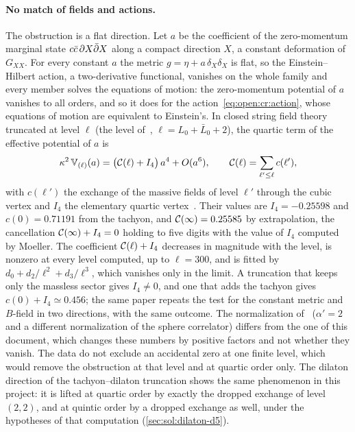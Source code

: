 \paragraph{No match of fields and actions.}
The obstruction is a flat direction.
Let $a$ be the coefficient of the zero-momentum marginal state $c \bar c \, \partial X \bar {\partial} X$ along a compact direction $X$, a constant deformation of $G_{XX}$.
For every constant $a$ the metric $g = \eta + a \, \delta_X \delta_X$ is flat, so the Einstein--Hilbert action, a two-derivative functional, vanishes on the whole family and every member solves the equations of motion: the zero-momentum potential of $a$ vanishes to all orders, and so it does for the action~\eqref{eq:open:cr:action}, whose equations of motion are equivalent to Einstein's.
In closed string field theory truncated at level $\ell$ (the level of~\cite{Yang:2005:TestingClosedString}, $\ell = L_0 + \bar L_0 + 2$), the quartic term of the effective potential of $a$ is
\begin{equation}
  \label{eq:open:cr:potential}
  \kappa^2 \, \mathbb V_{(\ell)}(a)
    = \bigl( {\mathcal{C}}(\ell) + I_4 \bigr) \, a^4
    + O(a^6),
  \qquad
  {\mathcal{C}}(\ell)
    = \sum_{\ell' \le \ell} c(\ell'),
\end{equation}
with $c(\ell')$ the exchange of the massive fields of level $\ell'$ through the cubic vertex and $I_4$ the elementary quartic vertex~\cite{Yang:2005:TestingClosedString}.
Their values are $I_4 = - 0.25598$ and $c(0) = 0.71191$ from the tachyon, and ${\mathcal{C}}(\infty) = 0.25585$ by extrapolation, the cancellation ${\mathcal{C}}(\infty) + I_4 = 0$ holding to five digits with the value of $I_4$ computed by Moeller.
The coefficient ${\mathcal{C}}(\ell) + I_4$ decreases in magnitude with the level, is nonzero at every level computed, up to $\ell = 300$, and is fitted by $d_0 + d_2 / \ell^2 + d_3 / \ell^3$, which vanishes only in the limit.
A truncation that keeps only the massless sector gives $I_4 \neq 0$, and one that adds the tachyon gives $c(0) + I_4 \simeq 0.456$; the same paper repeats the test for the constant metric and $B$-field in two directions, with the same outcome.
The normalization of~\cite{Yang:2005:TestingClosedString} ($\alpha' = 2$ and a different normalization of the sphere correlator) differs from the one of this document, which changes these numbers by positive factors and not whether they vanish.
The data do not exclude an accidental zero at one finite level, which would remove the obstruction at that level and at quartic order only.
The dilaton direction of the tachyon--dilaton truncation shows the same phenomenon in this project: it is lifted at quartic order by exactly the dropped exchange of level $(2, 2)$, and at quintic order by a dropped exchange as well, under the hypotheses of that computation (\cref{sec:sol:dilaton-d5}).

